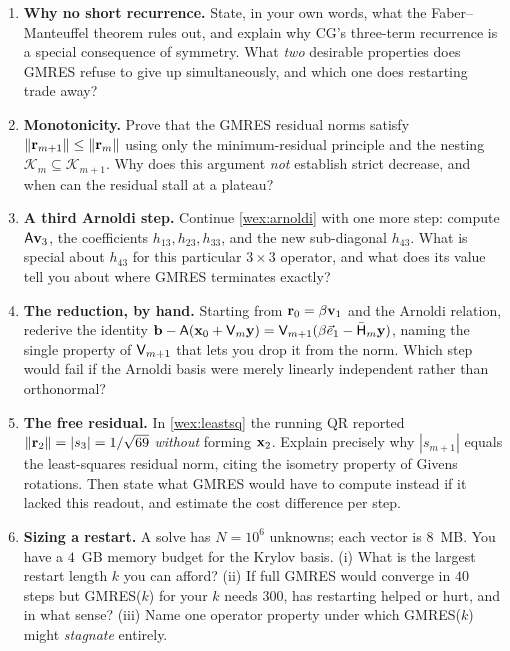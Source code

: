 \exercisessection
\begin{enumerate}[nosep]
  \item \textbf{Why no short recurrence.} State, in your own words, what the
  Faber--Manteuffel theorem rules out, and explain why CG's three-term recurrence is a
  special consequence of symmetry. What \emph{two} desirable properties does GMRES
  refuse to give up simultaneously, and which one does restarting trade away?

  \item \textbf{Monotonicity.} Prove that the GMRES residual norms satisfy
  $\lVert\mathbf{r}_{m+1}\rVert\le\lVert\mathbf{r}_m\rVert$ using only the minimum-residual principle and the
  nesting $\mathcal{K}_m\subseteq\mathcal{K}_{m+1}$. Why does this argument
  \emph{not} establish strict decrease, and when can the residual stall at a plateau?

  \item \textbf{A third Arnoldi step.} Continue \cref{wex:arnoldi} with one more step:
  compute $\mathsf{A}\mathbf{v}_3$, the coefficients $h_{13},h_{23},h_{33}$, and the new
  sub-diagonal $h_{43}$. What is special about $h_{43}$ for this particular $3\times3$
  operator, and what does its value tell you about where GMRES terminates exactly?

  \item \textbf{The reduction, by hand.} Starting from $\mathbf{r}_0=\beta\mathbf{v}_1$ and the
  Arnoldi relation, rederive the identity $\mathbf{b}-\mathsf{A}(\mathbf{x}_0+\mathsf{V}_m\mathbf{y})=
  \mathsf{V}_{m+1}(\beta\vec e_1-\bar{\mathsf{H}}_m\mathbf{y})$, naming the single property of
  $\mathsf{V}_{m+1}$ that lets you drop it from the norm. Which step would fail if the
  Arnoldi basis were merely linearly independent rather than orthonormal?

  \item \textbf{The free residual.} In \cref{wex:leastsq} the running QR reported
  $\lVert\mathbf{r}_2\rVert=|s_3|=1/\sqrt{69}$ \emph{without} forming $\mathbf{x}_2$. Explain precisely
  why $|s_{m+1}|$ equals the least-squares residual norm, citing the isometry property
  of Givens rotations. Then state what GMRES would have to compute instead if it lacked
  this readout, and estimate the cost difference per step.

  \item \textbf{Sizing a restart.} A solve has $N=10^6$ unknowns; each vector is $8$~MB.
  You have a $4$~GB memory budget for the Krylov basis. (i) What is the largest restart
  length $k$ you can afford? (ii) If full GMRES would converge in $40$ steps but
  GMRES($k$) for your $k$ needs $300$, has restarting helped or hurt, and in what sense?
  (iii) Name one operator property under which GMRES($k$) might \emph{stagnate} entirely.


\end{enumerate}
